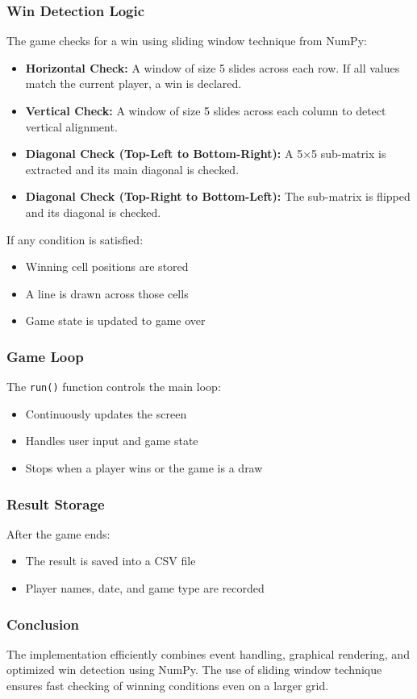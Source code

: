 \documentclass[12pt,letterpaper]{article}
\begin{document}
\subsubsection{Win Detection Logic}
The game checks for a win using sliding window technique from NumPy:
\begin{itemize}
\item \textbf{Horizontal Check:}
A window of size 5 slides across each row. If all values match the current player, a win is declared.
\item \textbf{Vertical Check:}
A window of size 5 slides across each column to detect vertical alignment.
\item \textbf{Diagonal Check (Top-Left to Bottom-Right):}
A 5×5 sub-matrix is extracted and its main diagonal is checked.
\item \textbf{Diagonal Check (Top-Right to Bottom-Left):}
The sub-matrix is flipped and its diagonal is checked.
\end{itemize}
If any condition is satisfied:
\begin{itemize}
\item Winning cell positions are stored
\item A line is drawn across those cells
\item Game state is updated to game over
\end{itemize}
\subsubsection{Game Loop}
The \texttt{run()} function controls the main loop:
\begin{itemize}
\item Continuously updates the screen
\item Handles user input and game state
\item Stops when a player wins or the game is a draw
\end{itemize}
\subsubsection{Result Storage}
After the game ends:
\begin{itemize}
\item The result is saved into a CSV file
\item Player names, date, and game type are recorded
\end{itemize}
\subsubsection{Conclusion}
The implementation efficiently combines event handling, graphical rendering, and optimized win 
detection using NumPy. The use of sliding window technique ensures fast checking of winning 
conditions even on a larger grid.
\end{document}
